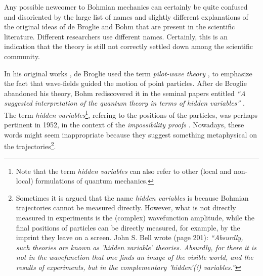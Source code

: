 \documentclass[nofootinbib, secnumarabic, amsmath, nobibnotes,11pt,aps,pra, floatfix]{revtex4-1}
\begin{document}
Any possible newcomer to Bohmian mechanics can certainly be quite confused and disoriented by the large list of names and slightly different explanations of the original ideas of de Broglie and Bohm that are present in the scientific literature. Different researchers use different names. Certainly, this is an indication that the theory is still not correctly settled down among the scientific community.


In his original works \cite{om.dB_AnnPhys,om.debroglie1927b}, de Broglie used the term \emph{pilot-wave theory} \cite{om.Valentini2006}, to emphasize the fact that wave-fields guided the motion of point particles.
After de Broglie abandoned his theory, Bohm rediscovered it in the seminal papers entitled \emph{``A suggested interpretation of the quantum theory in terms of hidden variables''} \cite{om.bohm1952a,om.bohm1952b}.
The term \emph{hidden variables}\footnote{Note that the term \emph{hidden variables} can also refer to other (local and non-local) formulations of quantum mechanics.}, refering to the  positions of the particles, was perhaps pertinent in 1952, in the context of the \emph{impossibility proofs} \cite{om.impossibility_proofs}.
Nowadays, these words might seem inappropriate because they suggest something metaphysical on the trajectories\footnote{Sometimes it is argued that the name \emph{hidden variables} is because Bohmian trajectories cannot be measured directly. However, what is not directly measured in experiments is the (complex) wavefunction amplitude, while the final positions of particles can be directly measured, for example, by the imprint they leave on a screen. John S. Bell wrote \cite{om.Bell1987} (page 201): \emph{``Absurdly, such theories are known as 'hidden variable' theories. Absurdly, for there it is not in the wavefunction that one finds an image of the visible world, and the results of experiments, but in the complementary 'hidden'(!) variables.''}}.
\end{document}
